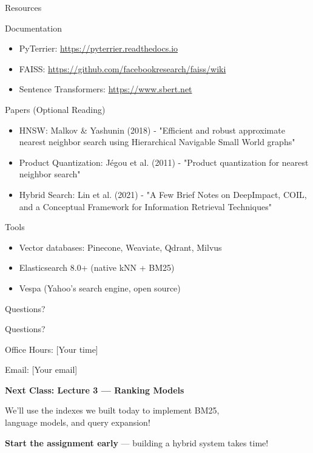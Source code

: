 \documentclass[aspectratio=169]{beamer}
\newif\ifanimated
\newcommand{\cpause}{\ifanimated\pause\fi}
\begin{document}
\begin{frame}[shrink=10]{Resources}
\begin{block}{Documentation}
\begin{itemize}
    \item PyTerrier: \url{https://pyterrier.readthedocs.io}
    \item FAISS: \url{https://github.com/facebookresearch/faiss/wiki}
    \item Sentence Transformers: \url{https://www.sbert.net}
\end{itemize}
\end{block}
\cpause

\begin{block}{Papers (Optional Reading)}
\begin{itemize}
    \item HNSW: Malkov \& Yashunin (2018) - "Efficient and robust approximate nearest neighbor search using Hierarchical Navigable Small World graphs"
    \item Product Quantization: Jégou et al. (2011) - "Product quantization for nearest neighbor search"
    \item Hybrid Search: Lin et al. (2021) - "A Few Brief Notes on DeepImpact, COIL, and a Conceptual Framework for Information Retrieval Techniques"
\end{itemize}
\end{block}
\cpause

\begin{block}{Tools}
\begin{itemize}
    \item Vector databases: Pinecone, Weaviate, Qdrant, Milvus
    \item Elasticsearch 8.0+ (native kNN + BM25)
    \item Vespa (Yahoo's search engine, open source)
\end{itemize}
\end{block}
\cpause
\end{frame}

\begin{frame}[shrink=10]{Questions?}
\begin{center}
\Huge Questions?

\vspace{2em}

\Large
Office Hours: [Your time]

\vspace{1em}

Email: [Your email]

\vspace{2em}

\normalsize
\textbf{Next Class: Lecture 3 --- Ranking Models}

\vspace{0.5em}

We'll use the indexes we built today to implement BM25, \\
language models, and query expansion!

\vspace{1em}

\textbf{Start the assignment early} --- building a hybrid system takes time!
\end{center}
\end{frame}
\end{document}
